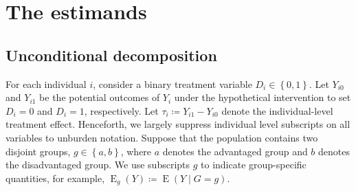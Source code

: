 \documentclass[12pt,a4paper]{article}
\newcommand{\E}{\operatorname{E}}
\begin{document}


\section{The estimands}
\subsection{Unconditional decomposition}
For each individual $i$, consider a binary treatment variable $D_i \in \left\lbrace 0,1 \right\rbrace$. Let $Y_{i0}$ and $Y_{i1}$ be the potential outcomes \citep{rubin_estimating_1974} of $Y_i$ under the hypothetical intervention to set $D_i=0$ and $D_i=1$, respectively. Let $\tau_i \coloneqq Y_{i1} - Y_{i0}$ denote the individual-level treatment effect. Henceforth, we largely suppress individual level subscripts on all variables to unburden notation. Suppose that the population contains two disjoint groups, $g \in \left\lbrace a,b \right\rbrace$, where $a$ denotes the advantaged group and $b$ denotes the disadvantaged group. We use subscripts $g$ to indicate group-specific quantities, for example, $\E_g(Y) \coloneqq \E(Y \mid G=g)$.  
\end{document}
